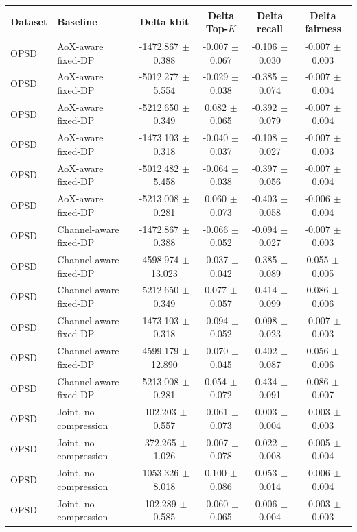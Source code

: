\begin{tabular}{llcccc}
\toprule
Dataset & Baseline & Delta kbit & Delta Top-$K$ & Delta recall & Delta fairness \\
\midrule
OPSD & AoX-aware fixed-DP & -1472.867 $\pm$ 0.388 & -0.007 $\pm$ 0.067 & -0.106 $\pm$ 0.030 & -0.007 $\pm$ 0.003 \\
OPSD & AoX-aware fixed-DP & -5012.277 $\pm$ 5.554 & -0.029 $\pm$ 0.038 & -0.385 $\pm$ 0.074 & -0.007 $\pm$ 0.004 \\
OPSD & AoX-aware fixed-DP & -5212.650 $\pm$ 0.349 & 0.082 $\pm$ 0.065 & -0.392 $\pm$ 0.079 & -0.007 $\pm$ 0.004 \\
OPSD & AoX-aware fixed-DP & -1473.103 $\pm$ 0.318 & -0.040 $\pm$ 0.037 & -0.108 $\pm$ 0.027 & -0.007 $\pm$ 0.003 \\
OPSD & AoX-aware fixed-DP & -5012.482 $\pm$ 5.458 & -0.064 $\pm$ 0.038 & -0.397 $\pm$ 0.056 & -0.007 $\pm$ 0.004 \\
OPSD & AoX-aware fixed-DP & -5213.008 $\pm$ 0.281 & 0.060 $\pm$ 0.073 & -0.403 $\pm$ 0.058 & -0.006 $\pm$ 0.004 \\
OPSD & Channel-aware fixed-DP & -1472.867 $\pm$ 0.388 & -0.066 $\pm$ 0.052 & -0.094 $\pm$ 0.027 & -0.007 $\pm$ 0.003 \\
OPSD & Channel-aware fixed-DP & -4598.974 $\pm$ 13.023 & -0.037 $\pm$ 0.042 & -0.385 $\pm$ 0.089 & 0.055 $\pm$ 0.005 \\
OPSD & Channel-aware fixed-DP & -5212.650 $\pm$ 0.349 & 0.077 $\pm$ 0.057 & -0.414 $\pm$ 0.099 & 0.086 $\pm$ 0.006 \\
OPSD & Channel-aware fixed-DP & -1473.103 $\pm$ 0.318 & -0.094 $\pm$ 0.052 & -0.098 $\pm$ 0.023 & -0.007 $\pm$ 0.003 \\
OPSD & Channel-aware fixed-DP & -4599.179 $\pm$ 12.890 & -0.070 $\pm$ 0.045 & -0.402 $\pm$ 0.087 & 0.056 $\pm$ 0.006 \\
OPSD & Channel-aware fixed-DP & -5213.008 $\pm$ 0.281 & 0.054 $\pm$ 0.072 & -0.434 $\pm$ 0.091 & 0.086 $\pm$ 0.007 \\
OPSD & Joint, no compression & -102.203 $\pm$ 0.557 & -0.061 $\pm$ 0.073 & -0.003 $\pm$ 0.004 & -0.003 $\pm$ 0.003 \\
OPSD & Joint, no compression & -372.265 $\pm$ 1.026 & -0.007 $\pm$ 0.078 & -0.022 $\pm$ 0.008 & -0.005 $\pm$ 0.004 \\
OPSD & Joint, no compression & -1053.326 $\pm$ 8.018 & 0.100 $\pm$ 0.086 & -0.053 $\pm$ 0.014 & -0.006 $\pm$ 0.004 \\
OPSD & Joint, no compression & -102.289 $\pm$ 0.585 & -0.060 $\pm$ 0.065 & -0.006 $\pm$ 0.004 & -0.003 $\pm$ 0.003 \\

\end{tabular}
